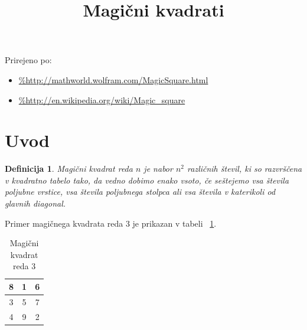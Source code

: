 \documentclass[a4paper,12pt]{article}
\title{Magični kvadrati}
\date{}
\newtheorem{definicija}{Definicija}
\begin{document}
\maketitle

Prirejeno po:

\begin{itemize}
   \item \url{%http://mathworld.wolfram.com/MagicSquare.html} 
   \item \url{%http://en.wikipedia.org/wiki/Magic_square}
\end{itemize}

\tableofcontents


\newpage

\section{Uvod}

\begin{definicija}
   \emph{Magični kvadrat} reda \(n\) je nabor \(n^2\) različnih števil,
   ki so razvrščena v kvadratno tabelo tako, da vedno dobimo enako vsoto,
   če seštejemo vsa števila poljubne vrstice, vsa števila poljubnega
   stolpca ali vsa števila v katerikoli od glavnih diagonal.
\end{definicija}

Primer magičnega kvadrata reda 3 je prikazan v tabeli ~\ref{table:mag3}. %

\begin{table}[!ht]
   \centering
   \caption{Magični kvadrat reda 3}
   \large
\begin{tabular}{|c|c|c|}
   \hline
   8 & 1 & 6 \\\hline
   3 & 5 & 7 \\\hline
   4 & 9 & 2 \\\hline
\end{tabular}
\normalsize
\label{table:mag3}
\end{table}
\end{document}
